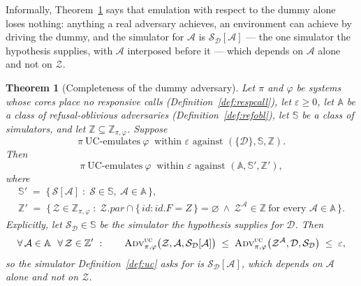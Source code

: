 \documentclass[11pt,a4paper]{article}
\renewcommand{\emptyset}{\varnothing}
\newcommand{\pars}{\mathit{par}}
\newcommand{\Zenv}{\mathcal{Z}}
\newcommand{\Adv}{\mathcal{A}}
\newcommand{\Dum}{\mathcal{D}}
\newcommand{\Sim}{\mathcal{S}}
\newcommand{\advtg}{\op{Adv}}
\newcommand{\Aset}{\mathbb{A}}
\newcommand{\SimSet}{\mathbb{S}}
\newcommand{\ZenvSet}{\mathbb{Z}}
\newcommand{\op}[1]{\textsc{#1}}
\newcommand{\id}{id}
\theoremstyle{accentdef}
\theoremstyle{accentplain}
\newtheorem{theorem}[definition]{Theorem}
\begin{document}
Informally, Theorem~\ref{thm:dummy} says that emulation with respect to the dummy alone loses
nothing: anything a real adversary achieves, an environment can achieve by driving the dummy,
and the simulator for $\Adv$ is $\Sim_{\Dum}[\Adv]$ --- the one simulator the hypothesis
supplies, with $\Adv$ interposed before it --- which depends on $\Adv$ alone and not on $\Zenv$.

\begin{theorem}[Completeness of the dummy adversary]\label{thm:dummy}
Let $\pi$ and $\varphi$ be systems whose cores place no responsive calls
(Definition~\ref{def:respcall}), let $\varepsilon \geq 0$, let $\Aset$ be a class of
refusal-oblivious adversaries (Definition~\ref{def:refobl}),
let $\SimSet$ be a class of simulators, and let $\ZenvSet \subseteq \ZenvSet_{\pi,\varphi}$.
Suppose
\[
  \pi \ \text{UC-emulates} \ \varphi \ \text{ within } \varepsilon \text{ against } (\{\Dum\},\SimSet,\ZenvSet) .
\]
Then
\[
  \pi \ \text{UC-emulates} \ \varphi \ \text{ within } \varepsilon \text{ against } (\Aset,\SimSet',\ZenvSet') ,
\]
where
\begin{gather*}
  \SimSet' \;=\; \bigl\{\, \Sim[\Adv] \;:\; \Sim \in \SimSet,\ \Adv \in \Aset \,\bigr\},
  \\
  \ZenvSet' \;=\; \bigl\{\, \Zenv \in \ZenvSet_{\pi,\varphi} \;:\;
  \Zenv.\pars \cap \{\, \id : \id.F = Z \,\} = \emptyset
  \ \wedge\ \Zenv^{\Adv} \in \ZenvSet \ \text{for every } \Adv \in \Aset \,\bigr\} .
\end{gather*}
Explicitly, let $\Sim_{\Dum} \in \SimSet$ be the simulator the hypothesis supplies for $\Dum$. Then
\[
  \forall\, \Adv \in \Aset \ \ \forall\, \Zenv \in \ZenvSet' \ : \qquad
  \advtg^{\op{uc}}_{\pi,\varphi}\bigl(\Zenv,\Adv,\Sim_{\Dum}[\Adv]\bigr)
  \;\leq\;
  \advtg^{\op{uc}}_{\pi,\varphi}\bigl(\Zenv^{\Adv},\Dum,\Sim_{\Dum}\bigr)
  \;\leq\; \varepsilon ,
\]
so the simulator Definition~\ref{def:uc} asks for is $\Sim_{\Dum}[\Adv]$, which depends on $\Adv$
alone and not on $\Zenv$.
\end{theorem}
\end{document}
